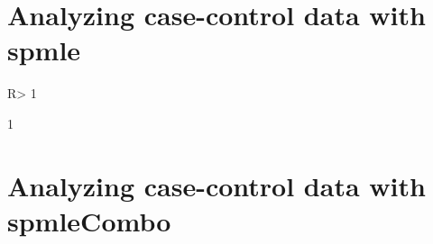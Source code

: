 \documentclass[nojss]{jss}
\begin{document}
\section{Analyzing case-control data with spmle} \label{sec:spmle}

\begin{CodeChunk}

\begin{CodeInput}
R> 1
\end{CodeInput}

\begin{CodeOutput}
[1] 1
\end{CodeOutput}
\end{CodeChunk}

\section{Analyzing case-control data with spmleCombo} \label{sec:spmleCombo}


\end{document}
